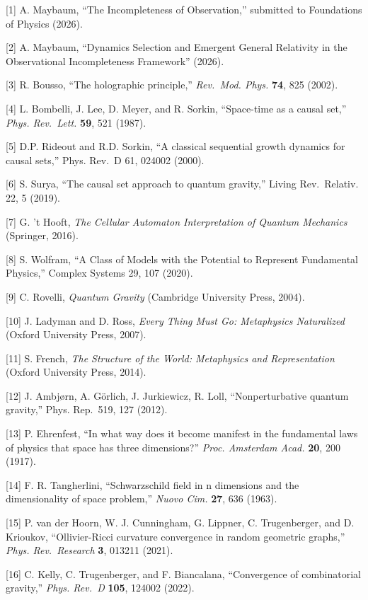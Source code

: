 \documentclass[
  11pt,
]{article}
\begin{document}
{[}1{]} A. Maybaum, ``The Incompleteness of Observation,'' submitted to
Foundations of Physics (2026).

{[}2{]} A. Maybaum, ``Dynamics Selection and Emergent General Relativity
in the Observational Incompleteness Framework'' (2026).

{[}3{]} R. Bousso, ``The holographic principle,'' \emph{Rev.~Mod. Phys.}
\textbf{74}, 825 (2002).

{[}4{]} L. Bombelli, J. Lee, D. Meyer, and R. Sorkin, ``Space-time as a
causal set,'' \emph{Phys. Rev.~Lett.} \textbf{59}, 521 (1987).

{[}5{]} D.P. Rideout and R.D. Sorkin, ``A classical sequential growth
dynamics for causal sets,'' Phys. Rev.~D 61, 024002 (2000).

{[}6{]} S. Surya, ``The causal set approach to quantum gravity,'' Living
Rev.~Relativ. 22, 5 (2019).

{[}7{]} G. 't Hooft, \emph{The Cellular Automaton Interpretation of
Quantum Mechanics} (Springer, 2016).

{[}8{]} S. Wolfram, ``A Class of Models with the Potential to Represent
Fundamental Physics,'' Complex Systems 29, 107 (2020).

{[}9{]} C. Rovelli, \emph{Quantum Gravity} (Cambridge University Press,
2004).

{[}10{]} J. Ladyman and D. Ross, \emph{Every Thing Must Go: Metaphysics
Naturalized} (Oxford University Press, 2007).

{[}11{]} S. French, \emph{The Structure of the World: Metaphysics and
Representation} (Oxford University Press, 2014).

{[}12{]} J. Ambjørn, A. Görlich, J. Jurkiewicz, R. Loll,
``Nonperturbative quantum gravity,'' Phys. Rep.~519, 127 (2012).

{[}13{]} P. Ehrenfest, ``In what way does it become manifest in the
fundamental laws of physics that space has three dimensions?''
\emph{Proc. Amsterdam Acad.} \textbf{20}, 200 (1917).

{[}14{]} F. R. Tangherlini, ``Schwarzschild field in n dimensions and
the dimensionality of space problem,'' \emph{Nuovo Cim.} \textbf{27},
636 (1963).

{[}15{]} P. van der Hoorn, W. J. Cunningham, G. Lippner, C.
Trugenberger, and D. Krioukov, ``Ollivier-Ricci curvature convergence in
random geometric graphs,'' \emph{Phys. Rev.~Research} \textbf{3}, 013211
(2021).

{[}16{]} C. Kelly, C. Trugenberger, and F. Biancalana, ``Convergence of
combinatorial gravity,'' \emph{Phys. Rev.~D} \textbf{105}, 124002
(2022).
\end{document}

